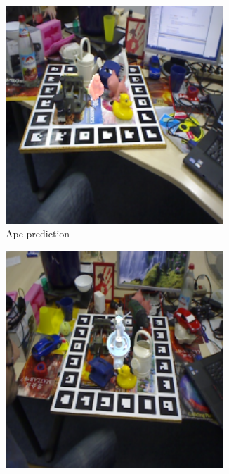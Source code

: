 \documentclass[../main.tex]{subfiles}
\begin{document}
\begin{figure}[H]
    \begin{subfigure}[t]{0.19\textwidth}
        \centering
        \captionsetup{width=.9\textwidth}
        \includegraphics[width=0.9\textwidth]{figures/segmentation/ape_prediction.png}
        \caption{Ape prediction}
        \label{subfig:ape_prediction}
    \end{subfigure}
    \begin{subfigure}[t]{0.19\textwidth}
        \centering
        \captionsetup{width=.9\textwidth}
        \includegraphics[width=0.9\textwidth]{figures/segmentation/bench_vise_prediction.png}

\end{subfigure}
\end{figure}
\end{document}
